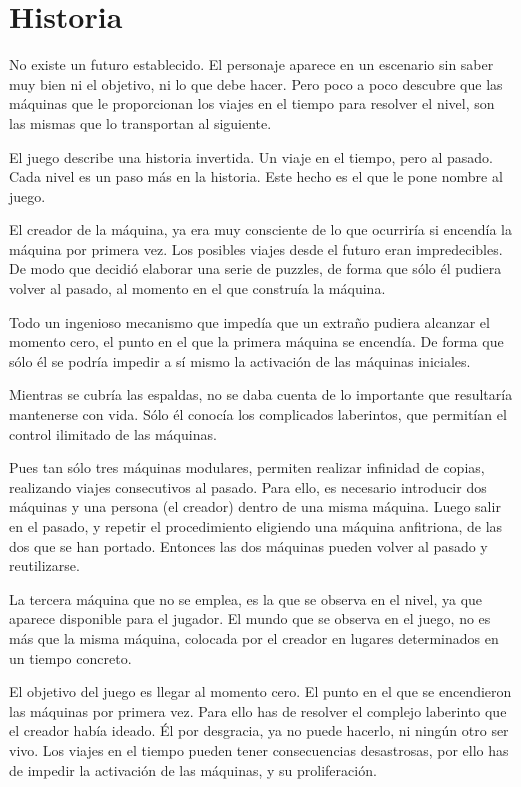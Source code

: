 \documentclass[11pt,a4paper]{article}
\begin{document}
\section{Historia}

No existe un futuro establecido. El personaje aparece en un escenario sin saber 
muy bien ni el objetivo, ni lo que debe hacer. Pero poco a poco descubre que las 
máquinas que le proporcionan los viajes en el tiempo para resolver el nivel, son 
las mismas que lo transportan al siguiente.

El juego describe una historia invertida. Un viaje en el tiempo, pero al pasado.  
Cada nivel es un paso más en la historia. Este hecho es el que le pone nombre al 
juego.

El creador de la máquina, ya era muy consciente de lo que ocurriría si encendía 
la máquina por primera vez. Los posibles viajes desde el futuro eran 
impredecibles.  De modo que decidió elaborar una serie de puzzles, de forma que 
sólo él pudiera volver al pasado, al momento en el que construía la máquina.

Todo un ingenioso mecanismo que impedía que un extraño pudiera alcanzar el 
momento cero, el punto en el que la primera máquina se encendía. De forma que 
sólo él se podría impedir a sí mismo la activación de las máquinas iniciales.

Mientras se cubría las espaldas, no se daba cuenta de lo importante que 
resultaría mantenerse con vida. Sólo él conocía los complicados laberintos, que 
permitían el control ilimitado de las máquinas.

Pues tan sólo tres máquinas modulares, permiten realizar infinidad de copias, 
realizando viajes consecutivos al pasado. Para ello, es necesario introducir dos 
máquinas y una persona (el creador) dentro de una misma máquina. Luego salir en 
el pasado, y repetir el procedimiento eligiendo una máquina anfitriona, de las 
dos que se han portado. Entonces las dos máquinas pueden volver al pasado y 
reutilizarse.

La tercera máquina que no se emplea, es la que se observa en el nivel, ya que 
aparece disponible para el jugador. El mundo que se observa en el juego, no es 
más que la misma máquina, colocada por el creador en lugares determinados en un 
tiempo concreto.

El objetivo del juego es llegar al momento cero. El punto en el que se 
encendieron las máquinas por primera vez. Para ello has de resolver el complejo 
laberinto que el creador había ideado. Él por desgracia, ya no puede hacerlo, ni 
ningún otro ser vivo. Los viajes en el tiempo pueden tener consecuencias 
desastrosas, por ello has de impedir la activación de las máquinas, y su 
proliferación.
\end{document}
